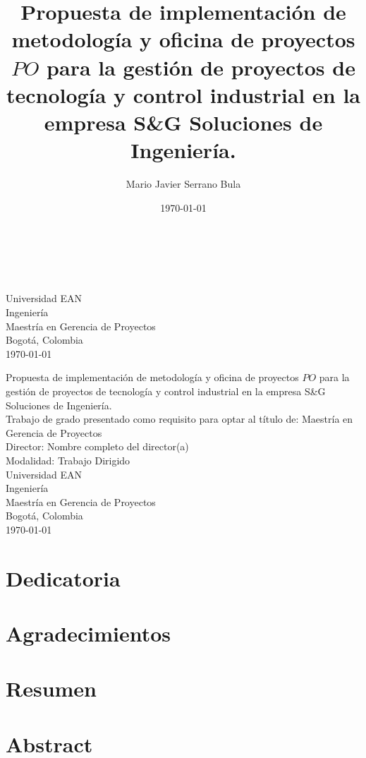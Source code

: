 \documentclass[12pt]{article}
\title{Propuesta de implementación de metodología y oficina de proyectos \(PO\) para la gestión de proyectos de tecnología y control industrial en la empresa S\&G Soluciones de Ingeniería.}
\author{Mario Javier Serrano Bula}
\date{\today}
\newcommand{\mydirector}{Nombre completo del director(a)}
\newcommand{\myuniversity}{Universidad EAN}
\newcommand{\myfaculty}{Ingeniería}
\newcommand{\myprogram}{Maestría en Gerencia de Proyectos}
\newcommand{\mycity}{Bogotá, Colombia}
\newcommand{\mytitle}{Propuesta de implementación de metodología y oficina de proyectos \(PO\) para la gestión de proyectos de tecnología y control industrial en la empresa S\&G Soluciones de Ingeniería.}
\newcommand{\chapterbreak}{\clearpage \thispagestyle{fancy}}
\begin{document}
\begin{titlepage}
\makeatletter
\@title\\[3cm]
\@author\\
\makeatother
\vfill
\begin{flushleft}
\myuniversity\\
\myfaculty\\
\myprogram\\
\mycity\\
\today
\end{flushleft}
\end{titlepage}

\chapterbreak
\begin{center}
\mytitle\\[2cm]
Trabajo de grado presentado como requisito para optar al título de: Maestría en Gerencia de Proyectos\\[2cm]
Director: \mydirector\\[2cm]
Modalidad: Trabajo Dirigido\\[1.5cm]
\vfill
\myuniversity\\
\myfaculty\\
\myprogram\\
\mycity\\
\today
\end{center}

\chapterbreak
\section*{}


\chapterbreak
\section*{Dedicatoria}


\chapterbreak
\section*{Agradecimientos}


\chapterbreak
\section*{Resumen}


\chapterbreak
\section*{Abstract}

\end{document}
